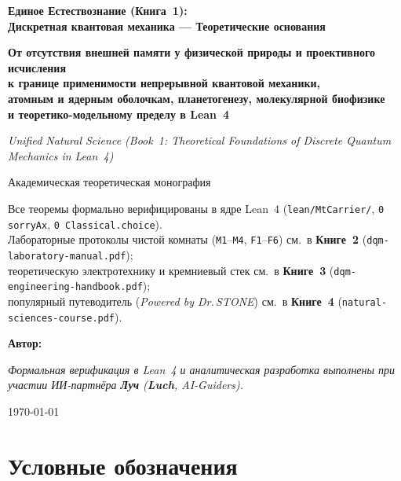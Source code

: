 \begin{titlepage}
  \centering
  \vspace*{1.8cm}
  {\LARGE\bfseries Единое Естествознание (Книга~1):\\ Дискретная квантовая механика — Теоретические основания\par}
  \vspace{0.4cm}
  {\Large\bfseries От отсутствия внешней памяти у физической природы и проективного исчисления\\
  к границе применимости непрерывной квантовой механики,\\
  атомным и ядерным оболочкам, планетогенезу, молекулярной биофизике\\
  и теоретико-модельному пределу в Lean~4\par}
  \vspace{0.5cm}
  {\normalsize\itshape Unified Natural Science (Book~1: Theoretical Foundations of Discrete Quantum Mechanics in Lean~4)\par}
  \vspace{1.0cm}
  {\large Академическая теоретическая монография\par}
  \vspace{0.35cm}
  {\normalsize Все теоремы формально верифицированы в ядре Lean~4 (\texttt{lean/MtCarrier/}, \texttt{0 sorryAx}, \texttt{0 Classical.choice}).\\
  Лабораторные протоколы чистой комнаты (\texttt{M1}--\texttt{M4}, \texttt{F1}--\texttt{F6}) см.\ в \textbf{Книге~2} (\texttt{dqm-laboratory-manual.pdf});\\
  теоретическую электротехнику и кремниевый стек см.\ в \textbf{Книге~3} (\texttt{dqm-engineering-handbook.pdf});\\
  популярный путеводитель (\emph{Powered by Dr.\,STONE}) см.\ в \textbf{Книге~4} (\texttt{natural-sciences-course.pdf}).\par}
  \vfill
  {\large\bfseries Автор: \bookauthorfullname\par}
  \vspace{0.2cm}
  {\footnotesize\itshape Формальная верификация в Lean~4 и аналитическая разработка выполнены при участии ИИ-партнёра \textbf{Луч} (\textbf{Luch}, AI-Guiders).\par}
  \vspace{0.3cm}
  {\large \today\par}
\end{titlepage}
\clearpage

\chapter*{Условные обозначения}

